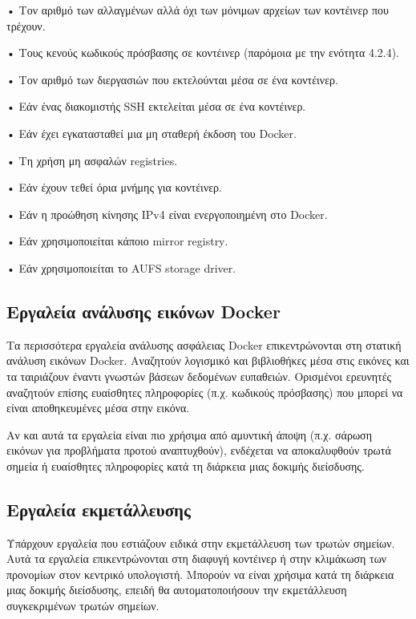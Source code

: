• Τον αριθμό των αλλαγμένων αλλά όχι των μόνιμων αρχείων των κοντέινερ που
τρέχουν.

• Τους κενούς κωδικούς πρόσβασης σε κοντέινερ (παρόμοια με την ενότητα 4.2.4).

• Τον αριθμό των διεργασιών που εκτελούνται μέσα σε ένα κοντέινερ.

• Εάν ένας διακομιστής \textlatin{SSH} εκτελείται μέσα σε ένα κοντέινερ.

• Εάν έχει εγκατασταθεί μια μη σταθερή έκδοση του \textlatin{Docker}.

• Τη χρήση μη ασφαλών \textlatin{registries}.

• Εάν έχουν τεθεί όρια μνήμης για κοντέινερ.

• Εάν η προώθηση κίνησης \textlatin{IPv4} είναι ενεργοποιημένη στο
\textlatin{Docker}.

• Εάν χρησιμοποιείται κάποιο \textlatin{mirror registry}.

• Εάν χρησιμοποιείται το \textlatin{AUFS storage driver}.

\subsection{Εργαλεία ανάλυσης εικόνων \textlatin{Docker}}

Τα περισσότερα εργαλεία ανάλυσης ασφάλειας \textlatin{Docker} επικεντρώνονται
στη στατική ανάλυση εικόνων \textlatin{Docker}. Αναζητούν λογισμικό και
βιβλιοθήκες μέσα στις εικόνες και τα ταιριάζουν έναντι γνωστών βάσεων δεδομένων
ευπαθειών. Ορισμένοι ερευνητές αναζητούν επίσης ευαίσθητες πληροφορίες
(π.χ. κωδικούς πρόσβασης) που μπορεί να είναι αποθηκευμένες μέσα στην εικόνα.

Αν και αυτά τα εργαλεία είναι πιο χρήσιμα από αμυντική άποψη (π.χ.
σάρωση εικόνων για προβλήματα προτού αναπτυχθούν), ενδέχεται να αποκαλυφθούν
τρωτά σημεία ή ευαίσθητες πληροφορίες κατά τη διάρκεια μιας δοκιμής διείσδυσης.


\subsection{Εργαλεία εκμετάλλευσης}

Υπάρχουν εργαλεία που εστιάζουν ειδικά στην εκμετάλλευση των τρωτών σημείων.
Αυτά τα εργαλεία επικεντρώνονται στη διαφυγή κοντέινερ ή στην κλιμάκωση των
προνομίων στον κεντρικό υπολογιστή. Μπορούν να είναι χρήσιμα κατά τη διάρκεια
μιας δοκιμής διείσδυσης, επειδή θα αυτοματοποιήσουν την εκμετάλλευση
συγκεκριμένων τρωτών σημείων.

